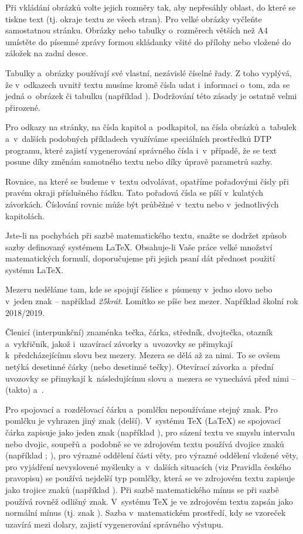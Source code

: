 Při vkládání obrázků volte jejich rozměry tak, aby nepřesáhly oblast, do které se tiskne text (tj. okraje textu ze všech stran). Pro velké obrázky vyčleňte samostatnou stránku. Obrázky nebo tabulky o~rozměrech větších než A4 umístěte do písemné zprávy formou skládanky všité do přílohy nebo vložené do záložek na zadní desce.

Tabulky a~obrázky používají své vlastní, nezávislé číselné řady. Z toho vyplývá, že v~odkazech uvnitř textu musíme kromě čísla udat i~informaci o~tom, zda se jedná o~obrázek či tabulku (například ). Dodržování této zásady je ostatně velmi přirozené.

Pro odkazy na stránky, na čísla kapitol a~podkapitol, na čísla obrázků a~tabulek a~v~dalších podobných příkladech využíváme speciálních prostředků DTP programu, které zajistí vygenerování správného čísla i~v~případě, že se text posune díky změnám samotného textu nebo díky úpravě parametrů sazby.


Rovnice, na které se budeme v~textu odvolávat, opatříme pořadovými čísly při pravém okraji příslušného řádku. Tato pořadová čísla se píší v~kulatých závorkách. Číslování rovnic může být průběžné v~textu nebo v~jednotlivých kapitolách.

Jste-li na pochybách při sazbě matematického textu, snažte se dodržet způsob sazby definovaný systémem \LaTeX{}. Obsahuje-li Vaše práce velké množství matematických formulí, doporučujeme při jejich psaní dát přednost použití systému \LaTeX{}.

Mezeru neděláme tam, kde se spojují číslice s~písmeny v~jedno slovo nebo v~jeden znak -- například {\it 25krát}. Lomítko se píše bez mezer. Například školní rok 2018/2019.

Členicí (interpunkční) znaménka tečka, čárka, středník, dvojtečka, otazník a~vykřičník, jakož i~uzavírací závorky a~uvozovky se přimykají k~předcházejícímu slovu bez mezery. Mezera se dělá až za nimi. To se ovšem netýká desetinné čárky (nebo desetinné tečky). Otevírací závorka a~přední uvozovky se přimykají k~následujícímu slovu a~mezera se vynechává před nimi -- (takto) a~.

Pro spojovací a~rozdělovací čárku a~pomlčku nepoužíváme stejný znak. Pro pomlčku je vyhrazen jiný znak (delší). V~systému TeX (\LaTeX{}) se spojovací čárka zapisuje jako jeden znak  (například ), pro sázení textu ve smyslu intervalu nebo dvojic, soupeřů a~podobně se ve zdrojovém textu používá dvojice znaků  (například ; ), pro výrazné oddělení části věty, pro výrazné oddělení vložené věty, pro vyjádření nevyslovené myšlenky a~v~dalších situacích (viz Pravidla českého pravopisu) se používá nejdelší typ pomlčky, která se ve zdrojovém textu zapisuje jako trojice znaků  (například ). Při sazbě matematického mínus se při sazbě používá rovněž odlišný znak. V~systému TeX je ve zdrojovém textu zapsán jako normální mínus (tj. znak ). Sazba v~matematickém prostředí, kdy se vzoreček uzavírá mezi dolary, zajistí vygenerování správného výstupu.

